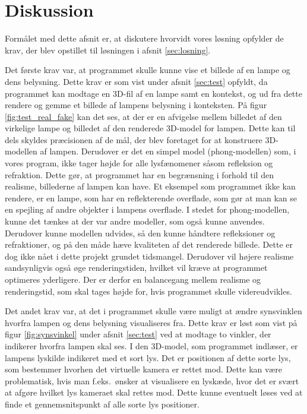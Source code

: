 \section{Diskussion}
\label{sec:diskussion}

Formålet med dette afsnit er, at diskutere hvorvidt vores løsning opfylder de krav, der blev opstillet til løsningen i afsnit \ref{sec:losning}.

Det første krav var, at programmet skulle kunne vise et billede af en lampe og dens belysning. Dette krav er som vist under afsnit \ref{sec:test} opfyldt, da programmet kan modtage en 3D-fil af en lampe samt en kontekst, og ud fra dette rendere og gemme et billede af lampens belysning i konteksten. På figur \ref{fig:test_real_fake} kan det ses, at der er en afvigelse mellem billedet af den virkelige lampe og billedet af den renderede 3D-model for lampen. Dette kan til dels skyldes præcisionen af de mål, der blev foretaget for at konstruere 3D-modellen af lampen. Derudover er det en simpel model (phong-modellen) som, i vores program, ikke tager højde for alle lysfænomener såsom refleksion og refraktion. Dette gør, at programmet har en begrænsning i forhold til den realisme, billederne af lampen kan have. Et eksempel som programmet ikke kan rendere, er en lampe, som har en reflekterende overflade, som gør at man kan se en spejling af andre objekter i lampens overflade. I stedet for phong-modellen, kunne det tænkes at der var andre modeller, som også kunne anvendes. Derudover kunne modellen udvides, så den kunne håndtere refleksioner og refraktioner, og på den måde hæve kvaliteten af det renderede billede. Dette er dog ikke nået i dette projekt grundet tidsmangel. Derudover vil højere realisme sandsynligvis også øge renderingstiden, hvilket vil kræve at programmet optimeres yderligere. Der er derfor en balancegang mellem realisme og renderingstid, som skal tages højde for, hvis programmet skulle videreudvikles.

Det andet krav var, at det i programmet skulle være muligt at ændre synsvinklen hvorfra lampen og dens belysning visualiseres fra. Dette krav er løst som vist på figur \ref{fig:synsvinkel} under afsnit \ref{sec:test} ved at modtage to vinkler, der indikerer hvorfra lampen skal ses. I den 3D-model, som programmet indlæser, er lampens lyskilde indikeret med et sort lys. Det er positionen af dette sorte lys, som bestemmer hvorhen det virtuelle kamera er rettet mod. Dette kan være problematisk, hvis man f.eks.\ ønsker at visualisere en lyskæde, hvor det er svært at afgøre hvilket lys kameraet skal rettes mod. Dette kunne eventuelt løses ved at finde et gennemsnitspunkt af alle sorte lys positioner. 

